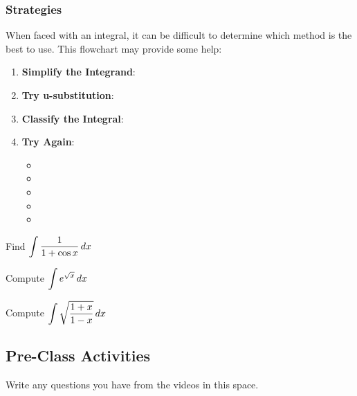 \documentclass[notes]{subfiles}
\begin{document}
	\subsubsection*{Strategies}
		When faced with an integral, it can be difficult to determine which method is the best to use.  This flowchart may provide some help:
		\begin{rmk}
			\begin{enumerate}
				\setlength \itemsep{40pt}
				\item \textbf{Simplify the Integrand}:\[\]
				\item \textbf{Try u-substitution}: \[\]
				\item \textbf{Classify the Integral}: \[\]

				\item \textbf{Try Again}:\[\]
					\begin{itemize}
						\setlength \itemsep{40pt}
						\item 
						\item 
						\item 
						\item 
						\item 
					\end{itemize}
			\end{enumerate}
		\end{rmk}
		\newpage
		
		\begin{ex}
			Find $\displaystyle \int \dfrac{1}{1+\cos x}\, dx $
		\end{ex}
			
		\begin{ex}
			Compute $\displaystyle \int e^{\sqrt{x}}\, dx$
		\end{ex}
			
		\begin{ex}
			Compute $\displaystyle \int \sqrt{\dfrac{1+x}{1-x}}\, dx$
		\end{ex}
			\newpage
	
	\subsection*{Pre-Class Activities}
		\begin{ex}
			Write any questions you have from the videos in this space.
		\end{ex}
		
\end{document}
